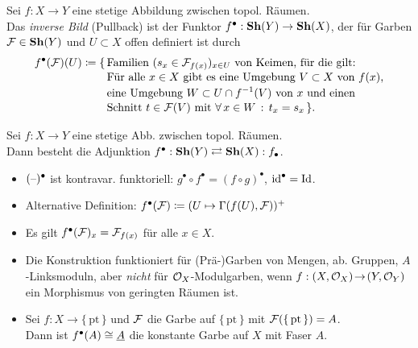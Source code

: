 \documentclass{cheat-sheet}
\newcommand{\pt}{\{ \, \mathrm{pt} \, \}} %
\begin{document}
\begin{defn}
  Sei $f : X \to Y$ eine stetige Abbildung zwischen topol. Räumen. \\
  Das \emph{inverse Bild} (Pullback) ist der Funktor $f^\bullet : \mathbf{Sh}(Y) \to \mathbf{Sh}(X)$, der für Garben $\mathcal{F} \in \mathbf{Sh}(Y)$ und $U \subset X$ offen definiert ist durch
  \begin{align*}
    f^\bullet(\mathcal{F})(U) \coloneqq \{ \, & \text{Familien $(s_x \in \mathcal{F}_{f(x)})_{x \in U}$ von Keimen, für die gilt:} \\[-2pt]
    & \text{Für alle $x \in X$ gibt es eine Umgebung $V \subset X$ von $f(x)$,} \\[-2pt]
    & \text{eine Umgebung $W \subset U \cap f^{-1}(V)$ von $x$ und einen} \\[-2pt]
    & \text{Schnitt $t \in \mathcal{F}(V)$ mit $\forall \, {x \in W} \,:\, t_x = s_x$} \, \}.
  \end{align*}
\end{defn}

\begin{prop}
  Sei $f : X \to Y$ eine stetige Abb. zwischen topol. Räumen. \\
  Dann besteht die Adjunktion \enspace $f^\bullet : \mathbf{Sh}(Y) \rightleftarrows \mathbf{Sh}(X) : f_\bullet$.
\end{prop}

\begin{bem}
  \begin{itemize}
    \item $(\text{--})^\bullet$ ist kontravar. funktoriell: $g^\bullet \circ f^\bullet = (f \circ g)^\bullet$, $\operatorname{id}^\bullet = \operatorname{Id}$.
    \item Alternative Definition: $f^\bullet(\mathcal{F}) \coloneqq (U \mapsto \Gamma(f(U), \mathcal{F}))^+$
    \item Es gilt $f^\bullet(\mathcal{F})_x = \mathcal{F}_{f(x)}$ für alle $x \in X$.
    \item Die Konstruktion funktioniert für (Prä-)Garben von Mengen, ab. Gruppen, $A$-Linksmoduln, aber {\em nicht} für $\mathcal{O}_X$-Modulgarben, wenn $f : (X, \mathcal{O}_X) \!\to\! (Y, \mathcal{O}_Y)$ ein Morphismus von geringten Räumen ist.
    \item Sei $f : X \to \pt$ und $\mathcal{F}$ die Garbe auf $\pt$ mit $\Fais(\pt) = A$. \\
    Dann ist $f^\bullet(A) \cong \underline{A}$ die konstante Garbe auf $X$ mit Faser $A$.
  \end{itemize}
\end{bem}
\end{document}

